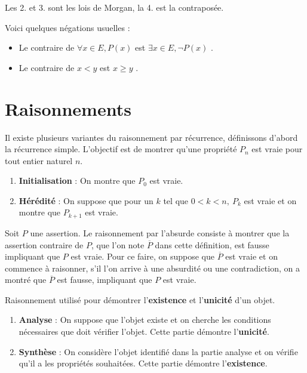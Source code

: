 \begin{remark}
    Les 2. et 3. sont les lois de Morgan, la 4. est la contraposée.
\end{remark}

\par \noindent Voici quelques négations usuelles :
\begin{itemize}
    \item Le contraire de \og $\forall x \in E, P(x)$ \fg est \og $\exists x \in E, \neg P(x)$ \fg.
    \item Le contraire de \og $x < y$ \fg est \og $x \geq y$ \fg.
\end{itemize}

\section{Raisonnements}

\begin{definition}
    Il existe plusieurs variantes du raisonnement par récurrence, définissons d'abord la récurrence simple. L'objectif est de montrer qu'une propriété $P_n$ est vraie pour tout entier naturel $n$. 
    \begin{enumerate}
        \item \textbf{Initialisation} : On montre que $P_0$ est vraie.
        \item \textbf{Hérédité} : On suppose que pour un $k$ tel que $0 < k < n,\ P_k$ est vraie et on montre que $P_{k+1}$ est vraie.
    \end{enumerate}
\end{definition}

\begin{definition}
    Soit $P$ une assertion. Le raisonnement par l'absurde consiste à montrer que la assertion contraire de $P$, que l'on note $\overline{P}$ dans cette définition, est fausse impliquant que $P$ est vraie.
    Pour ce faire, on suppose que $\overline{P}$ est vraie et on commence à raisonner, s'il l'on arrive à une absurdité ou une contradiction, on a montré que $\overline{P}$ est fausse, impliquant que $P$ est vraie.
\end{definition}

\begin{definition}
	Raisonnement utilisé pour démontrer l'\textbf{existence} et l'\textbf{unicité} d'un objet.
	\begin{enumerate}
		\item \textbf{Analyse} : On suppose que l'objet existe et on cherche les conditions nécessaires que doit vérifier l'objet. Cette partie démontre l'\textbf{unicité}.
		\item \textbf{Synthèse} : On considère l'objet identifié dans la partie analyse et on vérifie qu'il a les propriétés souhaitées. Cette partie démontre l'\textbf{existence}.
	\end{enumerate}
\end{definition}